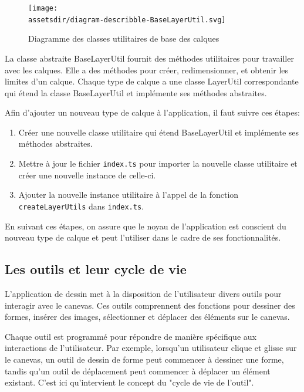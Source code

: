 \begin{figure}[h]
    \centering
    \texttt{[image: \\assetsdir/diagram-describble-BaseLayerUtil.svg]}
    \caption{Diagramme des classes utilitaires de base des calques}
    \label{fig:baseLayerUtilDiagram}
\end{figure}

La classe abstraite BaseLayerUtil fournit des méthodes utilitaires pour travailler avec les calques. Elle a des méthodes pour créer, redimensionner, et obtenir les limites d'un calque. Chaque type de calque a une classe LayerUtil correspondante qui étend la classe BaseLayerUtil et implémente ses méthodes abstraites.

Afin d'ajouter un nouveau type de calque à l'application, il faut suivre ces étapes:

\begin{enumerate}
    \item Créer une nouvelle classe utilitaire qui étend BaseLayerUtil et implémente ses méthodes abstraites.
    \item Mettre à jour le fichier \texttt{index.ts} pour importer la nouvelle classe utilitaire et créer une nouvelle instance de celle-ci.
    \item Ajouter la nouvelle instance utilitaire à l'appel de la fonction \texttt{createLayerUtils} dans \texttt{index.ts}.
\end{enumerate}

En suivant ces étapes, on assure que le noyau de l'application est conscient du nouveau type de calque et peut l'utiliser dans le cadre de ses fonctionnalités.

\subsection{Les outils et leur cycle de vie}

L'application de dessin met à la disposition de l'utilisateur divers outils pour interagir avec le canevas. Ces outils comprennent des fonctions pour dessiner des formes, insérer des images, sélectionner et déplacer des éléments sur le canevas.

Chaque outil est programmé pour répondre de manière spécifique aux interactions de l'utilisateur. Par exemple, lorsqu'un utilisateur clique et glisse sur le canevas, un outil de dessin de forme peut commencer à dessiner une forme, tandis qu'un outil de déplacement peut commencer à déplacer un élément existant. C'est ici qu'intervient le concept du "cycle de vie de l'outil".

